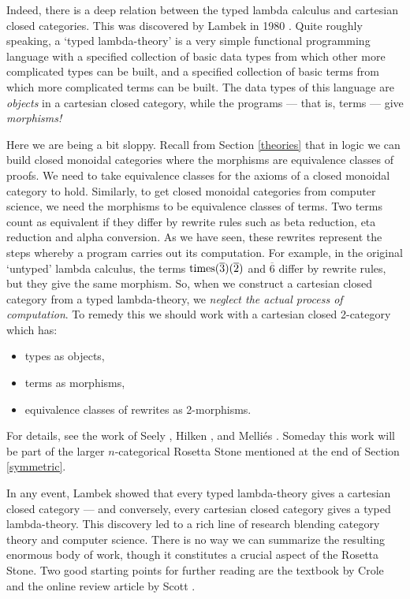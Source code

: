 \documentclass[12pt]{article}
\newcommand{\Times}{{\rm times}}
\begin{document}
Indeed, there is a deep relation between the typed lambda calculus and
cartesian closed categories.  This was discovered by Lambek in 1980
\cite{Lambek}.  Quite roughly speaking, a `typed lambda-theory' is a
very simple functional programming language with a specified
collection of basic data types from which other more complicated types
can be built, and a specified collection of basic terms from which
more complicated terms can be built.  The data types of this language
are {\it objects} in a cartesian closed category, while the programs ---
that is, terms --- give {\it morphisms!}

Here we are being a bit sloppy.  Recall from Section \ref{theories}
that in logic we can build closed monoidal categories where the
morphisms are equivalence classes of proofs.  We need to take
equivalence classes for the axioms of a closed monoidal category to
hold.  Similarly, to get closed monoidal categories from computer
science, we need the morphisms to be equivalence classes of terms.
Two terms count as equivalent if they differ by rewrite rules such as
beta reduction, eta reduction and alpha conversion.  As we have seen,
these rewrites represent the steps whereby a program carries out its
computation.  For example, in the original `untyped' lambda calculus,
the terms $\Times(\overline{3})(\overline{2})$ and $\overline{6}$
differ by rewrite rules, but they give the same morphism.  So, when we
construct a cartesian closed category from a typed lambda-theory, we
{\it neglect the actual process of computation}.  To remedy this we
should work with a cartesian closed 2-category which has:
\begin{itemize}
\item types as objects,
\item terms as morphisms,
\item equivalence classes of rewrites as 2-morphisms.
\end{itemize}
For details, see the work of Seely \cite{Seely}, Hilken \cite{Hilken},
and Melli\'es \cite{Mellies}.  Someday this work will be part of the
larger $n$-categorical Rosetta Stone mentioned at the end of Section
\ref{symmetric}.

In any event, Lambek showed that every typed lambda-theory gives a
cartesian closed category --- and conversely, every cartesian closed
category gives a typed lambda-theory.  This discovery led to a rich
line of research blending category theory and computer science.  There
is no way we can summarize the resulting enormous body of work, though
it constitutes a crucial aspect of the Rosetta Stone.  Two good
starting points for further reading are the textbook by Crole
\cite{Crole} and the online review article by Scott \cite{Scott}.
\end{document}
